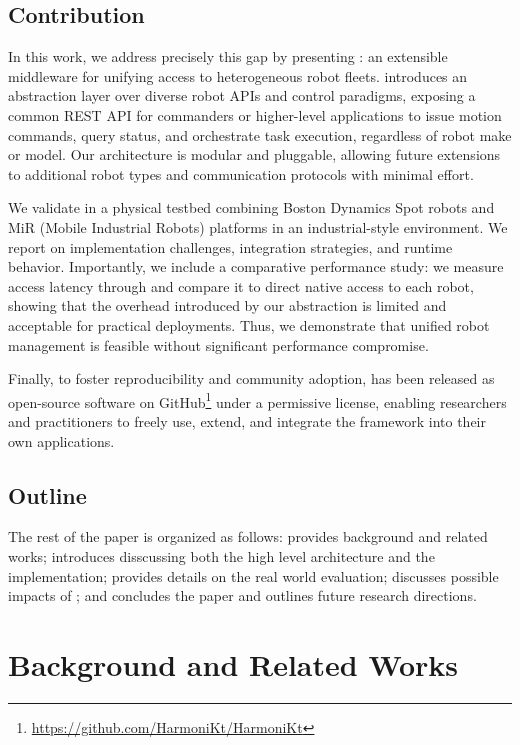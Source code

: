 \documentclass[conference]{IEEEtran}
\begin{document}
\subsection{Contribution}
In this work, 
 we address precisely this gap by presenting \approach{}:
 an extensible middleware for unifying access to heterogeneous robot fleets. 
% 
\approach{} introduces an abstraction layer over diverse robot APIs and control paradigms, 
 exposing a common REST API for commanders or higher-level applications to issue motion commands, 
 query status, and orchestrate task execution, regardless of robot make or model. 
% 
Our architecture is modular and pluggable, 
 allowing future extensions to additional robot types and communication protocols with minimal effort.

We validate \approach{} in a physical testbed combining Boston Dynamics Spot robots 
 and MiR (Mobile Industrial Robots) platforms in an industrial-style environment. 
% 
We report on implementation challenges, integration strategies, and runtime behavior. 
%
Importantly, we include a comparative performance study: 
 we measure access latency through \approach{} and compare it to direct native access to each robot, 
 showing that the overhead introduced by our abstraction is limited and acceptable for practical deployments. 
% 
Thus, we demonstrate that unified robot management is feasible without significant performance compromise.


Finally, 
 to foster reproducibility and community adoption, 
  \approach{} has been released as open-source software 
  on GitHub\footnote{\url{https://github.com/HarmoniKt/HarmoniKt}} 
  under a permissive license, enabling researchers and practitioners to freely use, extend, 
  and integrate the framework into their own applications.

\subsection{Outline}
The rest of the paper is organized as follows:
  provides background and related works;
  introduces \approach{} disscussing both the high level architecture and the implementation;
  provides details on the real world evaluation;
  discusses possible impacts of \approach{};
 and  concludes the paper and outlines future research directions.

\section{Background and Related Works}\label{sec:related}
\end{document}
